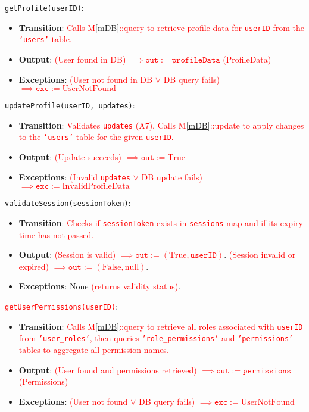 \documentclass[12pt, titlepage]{article}
\providecommand{\mref}[1]{M\ref{#1}}
\begin{document}
\noindent \texttt{getProfile(userID)}:
\begin{itemize}
    \item \textbf{Transition}: \textcolor{red}{Calls \mref{mDB}::query to retrieve profile data for \texttt{userID} from the \texttt{'users'} table.}
    \item \textbf{Output}: \textcolor{red}{(User found in DB) $\implies \texttt{out} := \texttt{profileData}$ (ProfileData)}
    \item \textbf{Exceptions}: \textcolor{red}{(User not found in DB $\lor$ DB query fails) $\implies \texttt{exc} := \text{UserNotFound}$}
\end{itemize}

\noindent \texttt{updateProfile(userID, updates)}:
\begin{itemize}
    \item \textbf{Transition}: \textcolor{red}{Validates \texttt{updates} (A7). Calls \mref{mDB}::update to apply changes to the \texttt{'users'} table for the given \texttt{userID}.}
    \item \textbf{Output}: \textcolor{red}{(Update succeeds) $\implies \texttt{out} := \text{True}$}
    \item \textbf{Exceptions}: \textcolor{red}{(Invalid \texttt{updates} $\lor$ DB update fails) $\implies \texttt{exc} := \text{InvalidProfileData}$}
\end{itemize}

\noindent \texttt{validateSession(sessionToken)}:
\begin{itemize}
    \item \textbf{Transition}: \textcolor{red}{Checks if \texttt{sessionToken} exists in \texttt{sessions} map and if its expiry time has not passed.}
    \item \textbf{Output}: \textcolor{red}{(Session is valid) $\implies \texttt{out} := (\text{True}, \texttt{userID})$}. \textcolor{red}{(Session invalid or expired) $\implies \texttt{out} := (\text{False}, \text{null})$}.
    \item \textbf{Exceptions}: None \textcolor{red}{(returns validity status)}.
\end{itemize}

\noindent \textcolor{red}{\texttt{getUserPermissions(userID)}}:
\begin{itemize}
    \item \textbf{Transition}: \textcolor{red}{Calls \mref{mDB}::query to retrieve all roles associated with \texttt{userID} from \texttt{'user\_roles'}, then queries \texttt{'role\_permissions'} and \texttt{'permissions'} tables to aggregate all permission names.}
    \item \textbf{Output}: \textcolor{red}{(User found and permissions retrieved) $\implies \texttt{out} := \texttt{permissions}$ (Permissions)}
    \item \textbf{Exceptions}: \textcolor{red}{(User not found $\lor$ DB query fails) $\implies \texttt{exc} := \text{UserNotFound}$}
\end{itemize}
\end{document}
